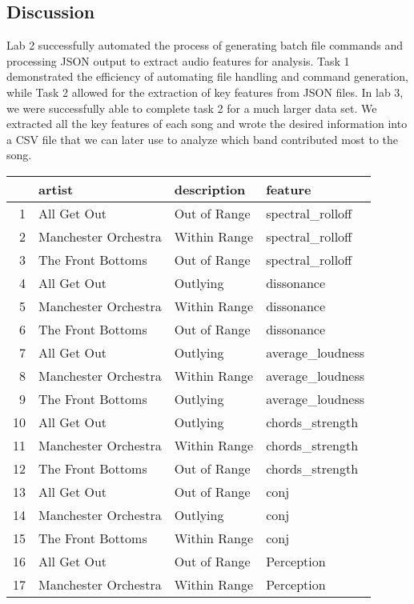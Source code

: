 \documentclass{article}\usepackage[]{graphicx}\usepackage[]{xcolor}
\begin{document}
\begin{multicols}{2}
\section{Discussion}
Lab 2 successfully automated the process of generating batch file commands and processing JSON output to extract audio features for analysis. Task 1 demonstrated the efficiency of automating file handling and command generation, while Task 2 allowed for the extraction of key features from JSON files. In lab 3, we were successfully able to complete task 2 for a much larger data set. We extracted all the key features of each song and wrote the desired information into a CSV file that we can later use to analyze which band contributed most to the song.


\begin{table}[ht]
\centering
\begin{tabular}{rlll}
  \hline
 & artist & description & feature \\ 
  \hline
1 & All Get Out & Out of Range & spectral\_rolloff \\ 
  2 & Manchester Orchestra & Within Range & spectral\_rolloff \\ 
  3 & The Front Bottoms & Out of Range & spectral\_rolloff \\ 
  4 & All Get Out & Outlying & dissonance \\ 
  5 & Manchester Orchestra & Within Range & dissonance \\ 
  6 & The Front Bottoms & Out of Range & dissonance \\ 
  7 & All Get Out & Outlying & average\_loudness \\ 
  8 & Manchester Orchestra & Within Range & average\_loudness \\ 
  9 & The Front Bottoms & Outlying & average\_loudness \\ 
  10 & All Get Out & Outlying & chords\_strength \\ 
  11 & Manchester Orchestra & Within Range & chords\_strength \\ 
  12 & The Front Bottoms & Out of Range & chords\_strength \\ 
  13 & All Get Out & Out of Range & conj \\ 
  14 & Manchester Orchestra & Outlying & conj \\ 
  15 & The Front Bottoms & Within Range & conj \\ 
  16 & All Get Out & Out of Range & Perception \\ 
  17 & Manchester Orchestra & Within Range & Perception \\ 

\end{tabular}
\end{table}
\end{multicols}
\end{document}
